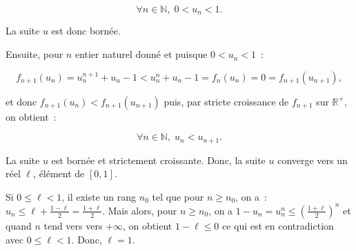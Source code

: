 \documentclass[11pt,a4paper]{article}
\newcommand{\Nn}{\mathbb{N}} \newcommand{\N}{\mathbb{N}}
\newcommand{\Rr}{\mathbb{R}} \newcommand{\R}{\mathbb{R}}
\begin{document}
$$\forall n\in\Nn,\;0<u_n<1.$$
 
La suite $u$ est donc bornée.

Ensuite, pour $n$ entier naturel donné et puisque $0<u_n<1$~:

$$f_{n+1}(u_n)=u_n^{n+1}+u_n-1<u_n^n+u_n-1=f_n(u_n)=0=f_{n+1}(u_{n+1}),$$

et donc $f_{n+1}(u_n)<f_{n+1}(u_{n+1})$ puis, par stricte croissance de $f_{n+1}$ sur $\Rr^+$, on obtient~:

$$\forall n\in\Nn,\;u_n<u_{n+1}.$$

La suite $u$ est bornée et strictement croissante. Donc, la suite $u$ converge vers un réel $\ell$, élément de $[0,1]$.

Si $0\leq\ell<1$, il existe un rang $n_0$ tel que pour $n\geq n_0$, on a~:~$u_n\leq\ell+\frac{1-\ell}{2}=\frac{1+\ell}{2}$. Mais alors, pour $n\geq n_0$, on a $1-u_n=u_n^n\leq(\frac{1+\ell}{2})^n$ et quand $n$ tend vers vers $+\infty$, on obtient $1-\ell\leq0$ ce qui est en contradiction avec $0\leq\ell<1$. Donc, $\ell=1$.
\end{document}
